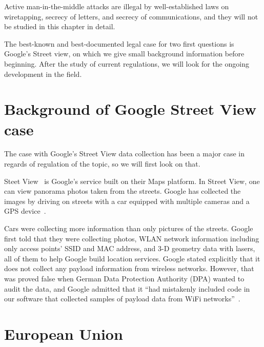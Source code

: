\documentclass[12pt,a4paper,oneside,pdftex]{report}
\begin{document}
Active man-in-the-middle attacks are illegal by well-established laws on wiretapping, secrecy of letters, and secrecy of communications, and they will not be studied in this chapter in detail.

The best-known and best-documented legal case for two first questions is Google's Street view, on which we give small background information before beginning. After the study of current regulations, we will look for the ongoing development in the field.



\section{Background of Google Street View case}
\label{sec:streetview}

The case with Google's Street View data collection has been a major case in regards of regulation of the topic, so we will first look on that. 

Steet View~\cite{googlestreetview} is Google's service built on their Maps platform. In Street View, one can view panorama photos taken from the streets. Google has collected the images by driving on streets with a car equipped with multiple cameras and a GPS device~\cite{streetview_behindscenes}.

Cars were collecting more information than only pictures of the streets. Google first told that they were collecting photos, WLAN network information including only access points' SSID and MAC address, and 3-D geometry data with lasers, all of them to help Google build location services. Google stated explicitly that it does not collect any payload information from wireless networks. \cite{fleischer_datacollected} However, that was proved false when German Data Protection Authority (DPA) wanted to audit the data, and Google admitted that it ``had mistakenly included code in our software that collected samples of payload data from WiFi networks''~\cite{eustace_datacollected}.

\section{European Union}
\label{sec:legal_europe}
\end{document}
